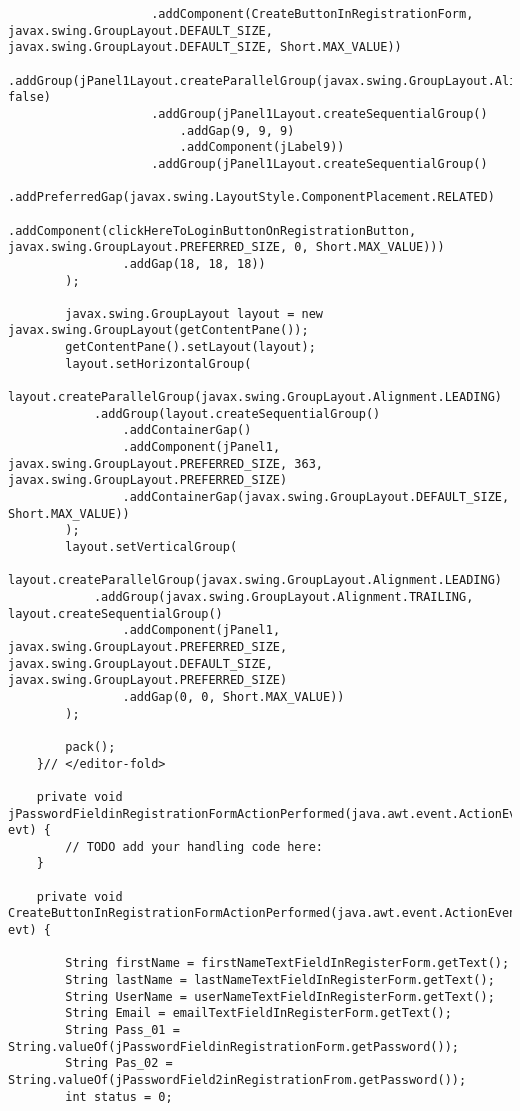 \documentclass[12pt,a4paper]{article}
\begin{document}
\begin{lstlisting}
                    .addComponent(CreateButtonInRegistrationForm, javax.swing.GroupLayout.DEFAULT_SIZE, javax.swing.GroupLayout.DEFAULT_SIZE, Short.MAX_VALUE))
                .addGroup(jPanel1Layout.createParallelGroup(javax.swing.GroupLayout.Alignment.LEADING, false)
                    .addGroup(jPanel1Layout.createSequentialGroup()
                        .addGap(9, 9, 9)
                        .addComponent(jLabel9))
                    .addGroup(jPanel1Layout.createSequentialGroup()
                        .addPreferredGap(javax.swing.LayoutStyle.ComponentPlacement.RELATED)
                        .addComponent(clickHereToLoginButtonOnRegistrationButton, javax.swing.GroupLayout.PREFERRED_SIZE, 0, Short.MAX_VALUE)))
                .addGap(18, 18, 18))
        );

        javax.swing.GroupLayout layout = new javax.swing.GroupLayout(getContentPane());
        getContentPane().setLayout(layout);
        layout.setHorizontalGroup(
            layout.createParallelGroup(javax.swing.GroupLayout.Alignment.LEADING)
            .addGroup(layout.createSequentialGroup()
                .addContainerGap()
                .addComponent(jPanel1, javax.swing.GroupLayout.PREFERRED_SIZE, 363, javax.swing.GroupLayout.PREFERRED_SIZE)
                .addContainerGap(javax.swing.GroupLayout.DEFAULT_SIZE, Short.MAX_VALUE))
        );
        layout.setVerticalGroup(
            layout.createParallelGroup(javax.swing.GroupLayout.Alignment.LEADING)
            .addGroup(javax.swing.GroupLayout.Alignment.TRAILING, layout.createSequentialGroup()
                .addComponent(jPanel1, javax.swing.GroupLayout.PREFERRED_SIZE, javax.swing.GroupLayout.DEFAULT_SIZE, javax.swing.GroupLayout.PREFERRED_SIZE)
                .addGap(0, 0, Short.MAX_VALUE))
        );

        pack();
    }// </editor-fold>                        

    private void jPasswordFieldinRegistrationFormActionPerformed(java.awt.event.ActionEvent evt) {                                                                 
        // TODO add your handling code here:
    }                                                                

    private void CreateButtonInRegistrationFormActionPerformed(java.awt.event.ActionEvent evt) {                                                               

        String firstName = firstNameTextFieldInRegisterForm.getText();
        String lastName = lastNameTextFieldInRegisterForm.getText();
        String UserName = userNameTextFieldInRegisterForm.getText();
        String Email = emailTextFieldInRegisterForm.getText();
        String Pass_01 = String.valueOf(jPasswordFieldinRegistrationForm.getPassword());
        String Pas_02 = String.valueOf(jPasswordField2inRegistrationFrom.getPassword());
        int status = 0;


\end{lstlisting}
\end{document}
